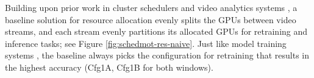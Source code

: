 


 Building upon prior work in cluster schedulers \cite{fair-1, fair-2} and video analytics systems \cite{videostorm}, a baseline solution for resource allocation evenly splits the GPUs between video streams, and each stream evenly partitions its allocated GPUs for retraining and inference tasks; see Figure \ref{fig:schedmot-res-naive}. Just like model training systems \cite{vizier,hyperband,pbt}, the baseline always picks the configuration for retraining that results in the highest accuracy ({\small Cfg1A, Cfg1B} for both windows).


